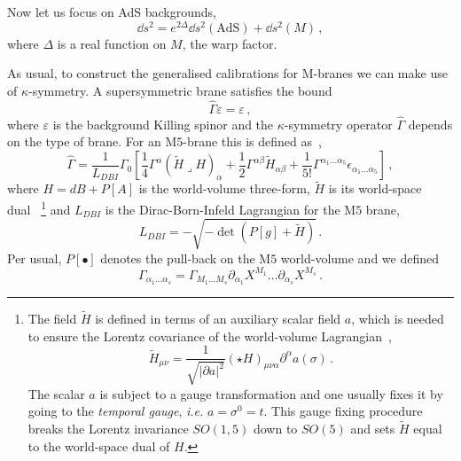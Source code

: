 \documentclass[debug]{phd}
\begin{document}
	Now let us focus on AdS backgrounds,
		\begin{equation}
		\label{eq:metric_mtheory_ads}
			\dd  s^2 = e^{2\Delta}\dd  s^2(\mathrm{AdS}) + \dd  s^2(M)\, ,
		\end{equation}
	where $\Delta$ is a real function on $M$, the warp factor.
	
	As usual, to construct the generalised calibrations for M-branes we can make use of $\kappa$-symmetry. 
	A supersymmetric brane satisfies the bound
		\begin{equation}
		\label{kprojector}
			\hat{\Gamma} \varepsilon = \varepsilon \, ,
		\end{equation}
	where $\varepsilon$ is the background Killing spinor and the $\kappa$-symmetry operator $\hat \Gamma$ depends on the type of brane. For an $\mathrm{M}5$-brane this is defined as~\cite{MS03,Gabella:2012rc},
		\begin{equation}
		\label{KopMth}
			\hat{\Gamma} = \frac{1}{L_{DBI}}\Gamma_0 \left[\frac{1}{4}\Gamma^\alpha  (\tilde{H}\lrcorner H)_\alpha  + \frac{1}{2} \Gamma^{\alpha \beta} \tilde{H}_{\alpha \beta}+ \frac{1}{5!}\Gamma^{\alpha _1 \ldots \alpha _5} \epsilon_{\alpha _1 \ldots \alpha _5} \right]\, , 
		\end{equation} 
	where $H = d B + P[A]$ is the world-volume three-form, $\tilde{H}$ is its world-space dual~\cite{Pasti:1997gx,Pasti:1995tn,Bergshoeff:1998vx}%
		\footnote{%
			The field $\tilde{H}$ is defined in terms of an auxiliary scalar field $a$, which is needed to ensure the Lorentz covariance of the world-volume Lagrangian~\cite{Pasti:1997gx,Pasti:1995tn},
				\begin{equation}
					\tilde{H}_{\mu\nu} = \frac{1}{\sqrt{\vert\partial a \vert^2}} \left(\star H\right)_{\mu\nu\alpha }\partial^{\alpha } a (\sigma)\, .
				\end{equation}
			The scalar $a$ is subject to a gauge transformation and one usually fixes it by going to the \emph{temporal gauge}, \emph{i.e.} $a= \sigma^0 = t $. 
			This gauge fixing procedure breaks the Lorentz invariance $SO(1,5)$ down to $SO(5)$ and sets $\tilde{H}$ equal to the world-space dual of $H$.%
			}%
		and $L_{DBI}$ is the Dirac-Born-Infeld Lagrangian for the $\mathrm{M}5$ brane,
		\begin{equation}
		\label{DBIlagr}
			L_{DBI} = - \sqrt{-\det(P[g] + \tilde{H})}\, .
		\end{equation} 
	Per usual, $P[\bullet]$ denotes the pull-back on the $\mathrm{M}5$ world-volume and we defined
		\begin{equation}
			\Gamma_{\alpha _1 \ldots \alpha _s} = \Gamma_{M_1 \ldots M_s} \partial_{\alpha _1}X^{M_1} \ldots \partial_{\alpha _s}X^{M_s}\, .
		\end{equation}
	
\end{document}
